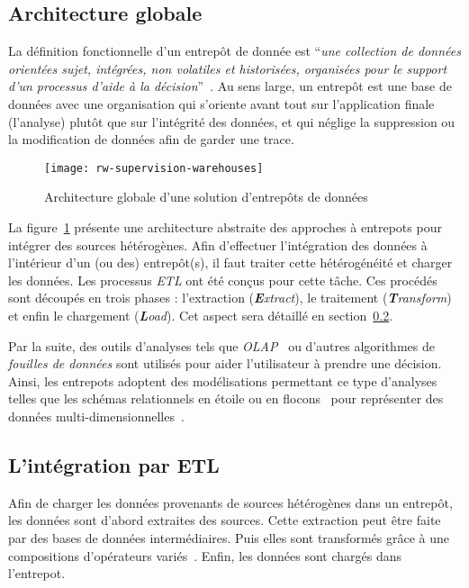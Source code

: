 \subsection{Architecture globale}
La définition fonctionnelle d'un entrepôt de donnée est \enquote{\it une collection de données orientées sujet, intégrées, non volatiles et historisées, organisées pour le support d’un processus d’aide à la décision}~\cite{Inmon:warehouse}. Au sens large, un entrepôt est une base de données avec une organisation qui s'oriente avant tout sur l'application finale (l'analyse) plutôt que sur l'intégrité des données, et qui néglige la suppression ou la modification de données afin de garder une trace.
\begin{figure}[ht]
	\centering
	\texttt{[image: rw-supervision-warehouses]}
	\caption{Architecture globale d'une solution d'entrepôts de données}\label{fig:rw:supervision:warehouses}
\end{figure}
La figure~\ref{fig:rw:supervision:warehouses} présente une architecture abstraite des approches à entrepots pour intégrer des sources hétérogènes. Afin d'effectuer l'intégration des données à l'intérieur d'un (ou des) entrepôt(s), il faut traiter cette hétérogénéité et charger les données. Les processus \textit{ETL} ont été conçus pour cette tâche. Ces procédés sont découpés en trois phases : l'extraction (\textit{\textbf{E}xtract}), le traitement (\textit{\textbf{T}ransform}) et enfin le chargement (\textit{\textbf{L}oad}). Cet aspect sera détaillé en section~\ref{sec:rw:supervision:warehouse:etl}.

Par la suite, des outils d'analyses tels que \textit{OLAP}~\cite{Codd:olap} ou d'autres algorithmes de \textit{fouilles de données} sont utilisés pour aider l'utilisateur à prendre une décision. Ainsi, les entrepots adoptent des modélisations permettant ce type d'analyses telles que les schémas relationnels en étoile ou en flocons~\cite{Levene:snowflake} pour représenter des données multi-dimensionnelles~\cite{Gray:cube}.

\subsection{L'intégration par ETL}\label{sec:rw:supervision:warehouse:etl}
Afin de charger les données provenants de sources hétérogènes dans un entrepôt, les données sont d'abord extraites des sources. Cette extraction peut être faite par des bases de données intermédiaires. Puis elles sont transformés grâce à une compositions d'opérateurs variés~\cite{Vassiliadis:taxonomy}. Enfin, les données sont chargés dans l'entrepot.

